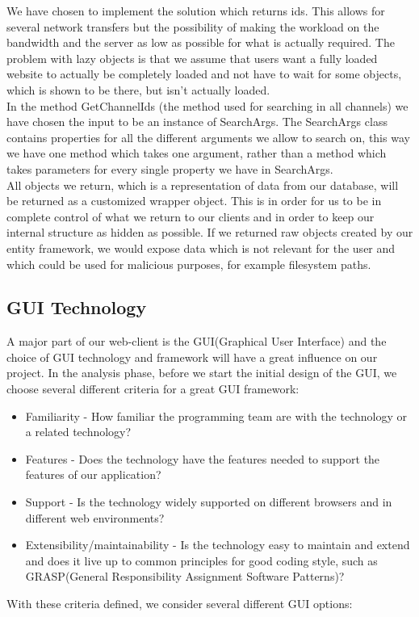 \documentclass[a4paper,11pt,report]{article}
\begin{document}
{We have chosen to implement the solution which returns ids. This allows for several network transfers but the possibility of making the workload on the bandwidth and the server as low as possible for what is actually required. The problem with lazy objects is that we assume that users want a fully loaded website to actually be completely loaded and not have to wait for some objects, which is shown to be there, but isn't actually loaded. \\
In the method GetChannelIds (the method used for searching in all channels) we have chosen the input to be an instance of SearchArgs. The SearchArgs class contains properties for all the different arguments we allow to search on, this way we have one method which takes one argument, rather than a method which takes parameters for every single property we have in SearchArgs. \\
All objects we return, which is a representation of data from our database, will be returned as a customized wrapper object. This is in order for us to be in complete control of what we return to our clients and in order to keep our internal structure as hidden as possible. If we returned raw objects created by our entity framework, we would expose data which is not relevant for the user and which could be used for malicious purposes, for example filesystem paths.

\subsection{GUI Technology}
A major part of our web-client is the GUI(Graphical User Interface) and the choice of GUI technology and framework will have a great influence on our project. In the analysis phase, before we start the initial design of the GUI, we choose several different criteria for a great GUI framework:
\begin{itemize}
\item Familiarity - How familiar the programming team are with the technology or a related technology?
\item Features - Does the technology have the features needed to support the features of our application?
\item Support - Is the technology widely supported on different browsers and in different web environments?
\item Extensibility/maintainability - Is the technology easy to maintain and extend and does it live up to common principles for good coding style, such as GRASP(General Responsibility Assignment Software Patterns)?
\end{itemize}
With these criteria defined, we consider several different GUI options:

}
\end{document}
